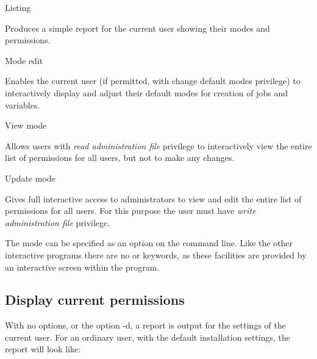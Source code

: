 Listing

Produces a simple report for the current user showing their modes and
permissions.

Mode edit

Enables the current user (if permitted, with change default modes
privilege) to interactively display and adjust their default modes for
creation of jobs and variables.

View mode

Allows users with \textit{read administration file} privilege to
interactively view the entire list of permissions for all users, but
not to make any changes.

Update mode

Gives full interactive access to \ProductName{} administrators to view and
edit the entire list of permissions for all users. For this purpose the
user must have \textit{write administration file} privilege.

The mode can be specified as an option on the command line. Like the
other interactive programs there are no
 or
 keywords, as these facilities are
provided by an interactive screen within the program.

\subsection{Display current permissions}
With no options, or the option -d, a report is output for the settings
of the current user. For an ordinary user, with the default
installation settings, the report will look like:

